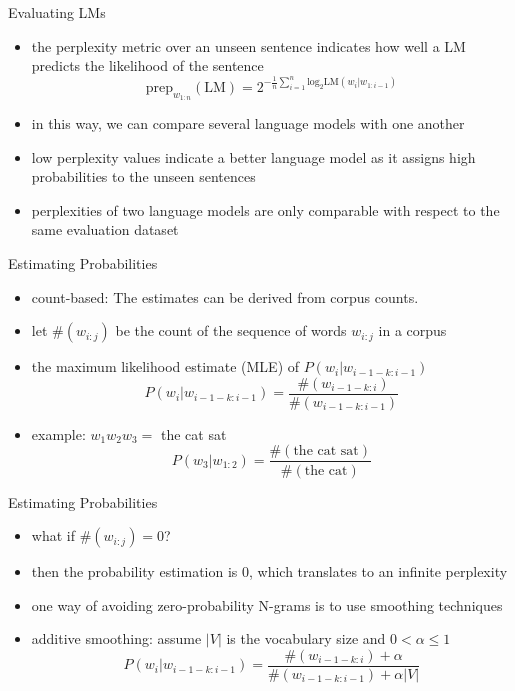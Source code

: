 \begin{frame}{Evaluating LMs}
    \begin{itemize}
        \item<1-> the perplexity metric over an unseen sentence indicates how well a LM predicts the likelihood of the sentence
        \begin{equation*}
            \text{prep}_{w_{1:n}} (\text{LM}) = 2^{-\frac{1}{n} \sum_{i=1}^{n} \text{log}_2 \text{LM}({w_i|w_{1:i-1}})}
        \end{equation*}
        \item<2-> in this way, we can compare several language models with one another
        \item<3-> low perplexity values indicate a better language model as it assigns high probabilities to the unseen sentences 
        \item<4-> perplexities of two language models are only comparable with respect to the same evaluation dataset
    \end{itemize}
\end{frame}
\begin{frame}{Estimating Probabilities}
\begin{itemize}
    \item<1-> count-based: The estimates can be derived from corpus counts. 
    \item<2-> let $\#(w_{i:j})$ be the count of the sequence of words $w_{i:j}$ in a corpus
    \item<3-> the maximum likelihood estimate (MLE) of $P(w_{i}|w_{i-1-k:i-1})$
    \begin{equation*}
        P(w_{i}|w_{i-1-k:i-1}) = \frac{\#(w_{i-1-k:i})}{\#(w_{i-1-k:i-1})}
    \end{equation*}
    \item<4-> example: $w_1w_2w_3 =$ the cat sat
    \begin{equation*}
        P(w_{3}|w_{1:2}) = \frac{\#(\text{the cat sat})}{\#(\text{the cat})}
    \end{equation*}
\end{itemize}
\end{frame}
\begin{frame}{Estimating Probabilities}
 \begin{itemize}
     \item<1-> what if $\#(w_{i:j}) =0 $?  
     \item<2-> then the probability estimation is $0$, which translates to an infinite perplexity 
     \item<3-> one way of avoiding zero-probability N-grams is to use smoothing techniques
     \item<4-> additive smoothing: assume $|V|$ is  the vocabulary size and $0<\alpha \leq 1$
     \begin{equation*}
         P(w_{i}|w_{i-1-k:i-1}) = \frac{\#(w_{i-1-k:i}) + \alpha}{\#(w_{i-1-k:i-1}) + \alpha|V|}
     \end{equation*}
     
 \end{itemize}   
\end{frame}
